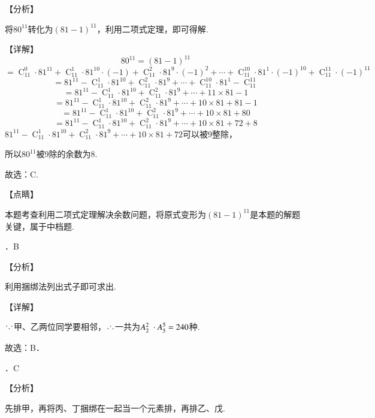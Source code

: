 \documentclass[a4paper,11pt,UTF8,twoside]{ctexart} %
\begin{document}
\noindent 【分析】

\noindent 将$80^{11} $转化为$\left(81-1\right)^{11} $，利用二项式定理，即可得解.

\noindent 【详解】
\[80^{11} =\left(81-1\right)^{11} \] 
\[=\mathop{C}\nolimits_{11}^{0} \cdot 81^{11} +\mathop{C}\nolimits_{11}^{1} \cdot 81^{10} \cdot \left(-1\right)+\mathop{C}\nolimits_{11}^{2} \cdot 81^{9} \cdot \left(-1\right)^{2} +\cdots +\mathop{C}\nolimits_{11}^{10} \cdot 81^{1} \cdot \left(-1\right)^{10} +\mathop{C}\nolimits_{11}^{11} \cdot \left(-1\right)^{11} \] 
\[=81^{11} -\mathop{C}\nolimits_{11}^{1} \cdot 81^{10} +\mathop{C}\nolimits_{11}^{2} \cdot 81^{9} +\cdots +\mathop{C}\nolimits_{11}^{10} \cdot 81^{1} -\mathop{C}\nolimits_{11}^{11} \] 
\[=81^{11} -\mathop{C}\nolimits_{11}^{1} \cdot 81^{10} +\mathop{C}\nolimits_{11}^{2} \cdot 81^{9} +\cdots +11\times 81-1\] 
\[=81^{11} -\mathop{C}\nolimits_{11}^{1} \cdot 81^{10} +\mathop{C}\nolimits_{11}^{2} \cdot 81^{9} +\cdots +10\times 81+81-1\] 
\[=81^{11} -\mathop{C}\nolimits_{11}^{1} \cdot 81^{10} +\mathop{C}\nolimits_{11}^{2} \cdot 81^{9} +\cdots +10\times 81+80\] 
\[=81^{11} -\mathop{C}\nolimits_{11}^{1} \cdot 81^{10} +\mathop{C}\nolimits_{11}^{2} \cdot 81^{9} +\cdots +10\times 81+72+8\] 
$81^{11} -\mathop{C}\nolimits_{11}^{1} \cdot 81^{10} +\mathop{C}\nolimits_{11}^{2} \cdot 81^{9} +\cdots +10\times 81+72$可以被9整除，

\noindent 所以$80^{11} $被9除的余数为8.

\noindent 故选：C.

\noindent 【点睛】

\noindent 本题考查利用二项式定理解决余数问题，将原式变形为$\left(81-1\right)^{11} $是本题的解题关键，属于中档题.

．B

\noindent 【分析】

\noindent 利用捆绑法列出式子即可求出.

\noindent 【详解】

\noindent ${\mkern1mu\raise4pt\hbox{.}\mkern1mu\raise1pt\hbox{.}\mkern1mu\raise4pt\hbox{.}\mkern1mu} $甲、乙两位同学要相邻，${\mkern1mu\raise1pt\hbox{.}\mkern1mu\raise4pt\hbox{.}\mkern1mu\raise1pt\hbox{.}\mkern1mu} $一共为$A_{2}^{2} {\it \; }\cdot A_{5}^{5} =240$种.

\noindent 故选：B．

．C

\noindent 【分析】

\noindent 先排甲，再将丙、丁捆绑在一起当一个元素排，再排乙、戊.
\end{document}
